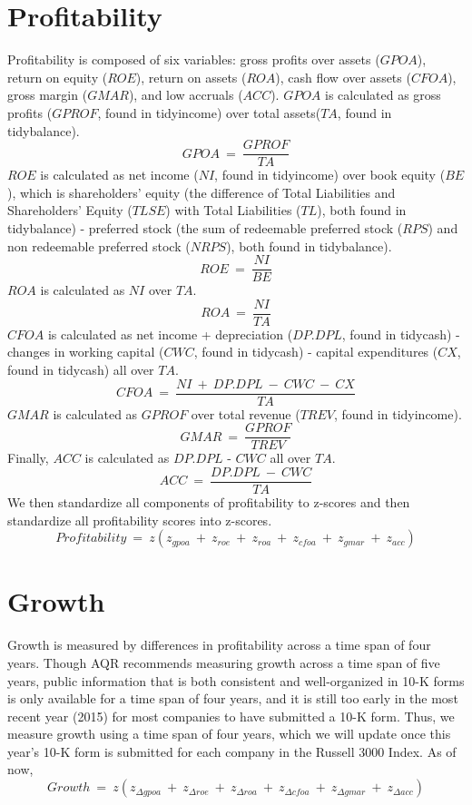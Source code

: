 \documentclass[12pt]{article}
\begin{document}

\section*{Profitability}
Profitability is composed of six variables: gross profits over assets ($GPOA$), return on equity ($ROE$), return on assets ($ROA$), cash flow over assets ($CFOA$), gross margin ($GMAR$), and low accruals ($ACC$). $GPOA$ is calculated as gross profits ($GPROF$, found in tidyincome) over total assets($TA$, found in tidybalance). $$GPOA \ = \ \frac{GPROF}{TA}$$ $ROE$ is calculated as net income ($NI$, found in tidyincome) over book equity ($BE$), which is shareholders' equity (the difference of Total Liabilities and Shareholders' Equity ($TLSE$) with Total Liabilities ($TL$), both found in tidybalance) - preferred stock (the sum of redeemable preferred stock ($RPS$) and non redeemable preferred stock ($NRPS$), both found in tidybalance). $$ROE \ = \ \frac{NI}{BE}$$ $ROA$ is calculated as $NI$ over $TA$. $$ROA \ = \ \frac{NI}{TA}$$ $CFOA$ is calculated as net income + depreciation ($DP.DPL$, found in tidycash) - changes in working capital ($CWC$, found in tidycash) - capital expenditures ($CX$, found in tidycash) all over $TA$. $$CFOA \ = \ \frac{NI \ + \ DP.DPL \ - \ CWC \ - \ CX}{TA}$$ $GMAR$ is calculated as $GPROF$ over total revenue ($TREV$, found in tidyincome). $$GMAR \ = \ \frac{GPROF}{TREV}$$ Finally, $ACC$ is calculated as $DP.DPL$ - $CWC$ all over $TA$. $$ACC \ = \ \frac{DP.DPL \ - \ CWC}{TA}$$ We then standardize all components of profitability to z-scores and then standardize all profitability scores into z-scores. $$Profitability \ = \ z(z_{gpoa} \ + \ z_{roe} \ + \ z_{roa} \ + \ z_{cfoa} \ + \ z_{gmar} \ + \ z_{acc})$$
\section*{Growth}
Growth is measured by differences in profitability across a time span of four years. Though AQR recommends measuring growth across a time span of five years, public information that is both consistent and well-organized in 10-K forms is only available for a time span of four years, and it is still too early in the most recent year (2015) for most companies to have submitted a 10-K form. Thus, we measure growth using a time span of four years, which we will update once this year's 10-K form is submitted for each company in the Russell 3000 Index. As of now, $$Growth \ = \ z(z_{\Delta gpoa} \ + \ z_{\Delta roe} \ + \ z_{\Delta roa} \ + \ z_{\Delta cfoa} \ + \ z_{\Delta gmar} \ + \ z_{\Delta acc})$$
\end{document}
